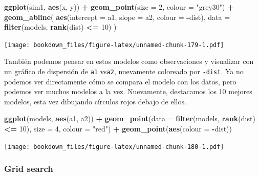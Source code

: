 \documentclass[]{book}
\newenvironment{Shaded}{\begin{snugshade}}{\end{snugshade}}
\newcommand{\DataTypeTok}[1]{\textcolor[rgb]{0.13,0.29,0.53}{#1}}
\newcommand{\DecValTok}[1]{\textcolor[rgb]{0.00,0.00,0.81}{#1}}
\newcommand{\KeywordTok}[1]{\textcolor[rgb]{0.13,0.29,0.53}{\textbf{#1}}}
\newcommand{\NormalTok}[1]{#1}
\newcommand{\OperatorTok}[1]{\textcolor[rgb]{0.81,0.36,0.00}{\textbf{#1}}}
\newcommand{\StringTok}[1]{\textcolor[rgb]{0.31,0.60,0.02}{#1}}
\begin{document}
\begin{Shaded}
\begin{Highlighting}[]
\KeywordTok{ggplot}\NormalTok{(sim1, }\KeywordTok{aes}\NormalTok{(x, y)) }\OperatorTok{+}\StringTok{ }
\StringTok{  }\KeywordTok{geom_point}\NormalTok{(}\DataTypeTok{size =} \DecValTok{2}\NormalTok{, }\DataTypeTok{colour =} \StringTok{"grey30"}\NormalTok{) }\OperatorTok{+}\StringTok{ }
\StringTok{  }\KeywordTok{geom_abline}\NormalTok{(}
    \KeywordTok{aes}\NormalTok{(}\DataTypeTok{intercept =}\NormalTok{ a1, }\DataTypeTok{slope =}\NormalTok{ a2, }\DataTypeTok{colour =} \OperatorTok{-}\NormalTok{dist), }
    \DataTypeTok{data =} \KeywordTok{filter}\NormalTok{(models, }\KeywordTok{rank}\NormalTok{(dist) }\OperatorTok{<=}\StringTok{ }\DecValTok{10}\NormalTok{)}
\NormalTok{  )}
\end{Highlighting}
\end{Shaded}

\texttt{[image: bookdown\_files/figure-latex/unnamed-chunk-179-1.pdf]}

También podemos pensar en estos modelos como observaciones y visualizar con un gráfico de dispersión de \texttt{a1} vs\texttt{a2}, nuevamente coloreado por \texttt{-dist}. Ya no podemos ver directamente cómo se compara el modelo con los datos, pero podemos ver muchos modelos a la vez. Nuevamente, destacamos los 10 mejores modelos, esta vez dibujando círculos rojos debajo de ellos.

\begin{Shaded}
\begin{Highlighting}[]
\KeywordTok{ggplot}\NormalTok{(models, }\KeywordTok{aes}\NormalTok{(a1, a2)) }\OperatorTok{+}
\StringTok{  }\KeywordTok{geom_point}\NormalTok{(}\DataTypeTok{data =} \KeywordTok{filter}\NormalTok{(models, }\KeywordTok{rank}\NormalTok{(dist) }\OperatorTok{<=}\StringTok{ }\DecValTok{10}\NormalTok{), }\DataTypeTok{size =} \DecValTok{4}\NormalTok{, }\DataTypeTok{colour =} \StringTok{"red"}\NormalTok{) }\OperatorTok{+}
\StringTok{  }\KeywordTok{geom_point}\NormalTok{(}\KeywordTok{aes}\NormalTok{(}\DataTypeTok{colour =} \OperatorTok{-}\NormalTok{dist))}
\end{Highlighting}
\end{Shaded}

\texttt{[image: bookdown\_files/figure-latex/unnamed-chunk-180-1.pdf]}

\hypertarget{grid-search}{%
\subsubsection{Grid search}\label{grid-search}}
\end{document}
